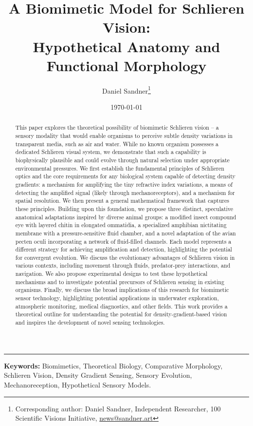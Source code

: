 \documentclass[11pt]{article}
\title{A Biomimetic Model for Schlieren Vision:\\Hypothetical Anatomy and Functional Morphology}
\author{{Daniel Sandner}\thanks{Corresponding author: Daniel Sandner, Independent Researcher, 100 Scientific Visions Initiative, \href{news@sandner.art}{news@sandner.art}}} %
\date{\today} %
\begin{document}
\maketitle

\bigskip\noindent\rule{\linewidth}{0.4pt}\bigskip

\begin{abstract}
This paper explores the theoretical possibility of biomimetic Schlieren vision – a sensory modality that would enable organisms to perceive subtle density variations in transparent media, such as air and water. While no known organism possesses a dedicated Schlieren visual system, we demonstrate that such a capability is biophysically plausible and could evolve through natural selection under appropriate environmental pressures. We first establish the fundamental principles of Schlieren optics and the core requirements for any biological system capable of detecting density gradients: a mechanism for amplifying the tiny refractive index variations, a means of detecting the amplified signal (likely through mechanoreceptors), and a mechanism for spatial resolution. We then present a general mathematical framework that captures these principles. Building upon this foundation, we propose three distinct, speculative anatomical adaptations inspired by diverse animal groups: a modified insect compound eye with layered chitin in elongated ommatidia, a specialized amphibian nictitating membrane with a pressure-sensitive fluid chamber, and a novel adaptation of the avian pecten oculi incorporating a network of fluid-filled channels. Each model represents a different strategy for achieving amplification and detection, highlighting the potential for convergent evolution. We discuss the evolutionary advantages of Schlieren vision in various contexts, including movement through fluids, predator-prey interactions, and navigation. We also propose experimental designs to test these hypothetical mechanisms and to investigate potential precursors of Schlieren sensing in existing organisms. Finally, we discuss the broad implications of this research for biomimetic sensor technology, highlighting potential applications in underwater exploration, atmospheric monitoring, medical diagnostics, and other fields. This work provides a theoretical outline for understanding the potential for density-gradient-based vision and inspires the development of novel sensing technologies.
\end{abstract}

\noindent\textbf{Keywords:} Biomimetics, Theoretical Biology, Comparative Morphology, Schlieren Vision, Density Gradient Sensing, Sensory Evolution, Mechanoreception, Hypothetical Sensory Models.
\end{document}
